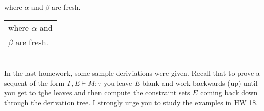 \documentclass[11pt]{article}
\begin{document}
{\hspace{.25in}} where $\alpha$ and $\beta$ are fresh.
\vspace{.125in}\\

{\hspace{.25in}}
\begin{tabular}{l}
 where $\alpha$ and \\
 $\beta$ are fresh.
\end{tabular}
\vspace{.125in}\\

In the last homework, some sample deriviations were given.  Recall that to
prove a sequent of the form $\Gamma,E\vdash{}M:\tau$ you leave $E$ blank and
work backwards (up) until you get to tghe leaves and then compute the
constraint sets $E$ coming back down through the derivation tree.  I strongly
urge you to study the examples in HW 18.

\end{document}

